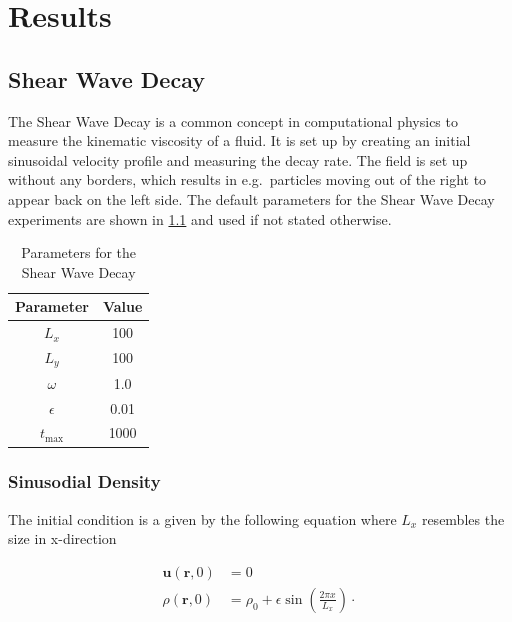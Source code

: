 \chapter{Results}


\section{Shear Wave Decay}
The Shear Wave Decay is a common concept in computational physics to measure the kinematic viscosity of a fluid.
It is set up by creating an initial sinusoidal velocity profile and measuring the decay rate.
The field is set up without any borders, which results in e.g.\ particles moving out of the right to appear back on the left side.
The default parameters for the Shear Wave Decay experiments are shown in \cref{tab:swd-parameters} and used if not stated otherwise.

\begin{table}[ht]
    \centering %
    \begin{tabular}{c c}
        \hline\hline %
        Parameter  & Value \\ [0.5ex] %
        \hline %
        $L_x$      & 100   \\
        $L_y$      & 100   \\
        $\omega$   & 1.0   \\
        $\epsilon$ & 0.01  \\
        $t_{\max}$ & 1000  \\ [1ex] %
        \hline %
    \end{tabular}
    \caption{Parameters for the Shear Wave Decay} %
    \label{tab:swd-parameters}
\end{table}

\subsection{Sinusodial Density}
The initial condition is a given by the following equation where $L_x$ resembles the size in x-direction

\begin{equation*}
    \begin{aligned}
        \mathbf{u}(\mathbf{r},0) &= 0 \\
        \rho(\mathbf{r},0) &= \rho_0 + \epsilon \sin \left( \frac{2 \pi x}{L_x} \right) \cdot
    \end{aligned}
\end{equation*}

